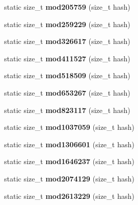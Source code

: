\begin{DoxyCompactItemize}
\item 
static size\+\_\+t {\bfseries mod205759} (size\+\_\+t hash)\label{structska_1_1prime__number__hash__policy_a0d54457b4ec5dfc31af1365f86a7dc36}

\item 
static size\+\_\+t {\bfseries mod259229} (size\+\_\+t hash)\label{structska_1_1prime__number__hash__policy_a0e546081995005fe117e9395b9ddcb09}

\item 
static size\+\_\+t {\bfseries mod326617} (size\+\_\+t hash)\label{structska_1_1prime__number__hash__policy_a0359c18d304e0e1c66fc79fbb6581e03}

\item 
static size\+\_\+t {\bfseries mod411527} (size\+\_\+t hash)\label{structska_1_1prime__number__hash__policy_ae359e734efb85a7215f7934c032d9553}

\item 
static size\+\_\+t {\bfseries mod518509} (size\+\_\+t hash)\label{structska_1_1prime__number__hash__policy_a0ab2660c0df51f19fc2968b4f73bc660}

\item 
static size\+\_\+t {\bfseries mod653267} (size\+\_\+t hash)\label{structska_1_1prime__number__hash__policy_a1621841fce8d8e6b83aac9c212cd67cd}

\item 
static size\+\_\+t {\bfseries mod823117} (size\+\_\+t hash)\label{structska_1_1prime__number__hash__policy_a006068c645ec6704b7973cb4ebb38f19}

\item 
static size\+\_\+t {\bfseries mod1037059} (size\+\_\+t hash)\label{structska_1_1prime__number__hash__policy_ad7317d582c8338ae714c68ba9fc87fe6}

\item 
static size\+\_\+t {\bfseries mod1306601} (size\+\_\+t hash)\label{structska_1_1prime__number__hash__policy_a6cd73834afc77f8b8653aeeea29882a7}

\item 
static size\+\_\+t {\bfseries mod1646237} (size\+\_\+t hash)\label{structska_1_1prime__number__hash__policy_af23e2f41687d2d49f95aa479be71f39f}

\item 
static size\+\_\+t {\bfseries mod2074129} (size\+\_\+t hash)\label{structska_1_1prime__number__hash__policy_a84871bf07f2a3087aa930d7812f3d0db}

\item 
static size\+\_\+t {\bfseries mod2613229} (size\+\_\+t hash)\label{structska_1_1prime__number__hash__policy_af4ff19b682a8d71fbfe269d0f28a5369}


\end{DoxyCompactItemize}
